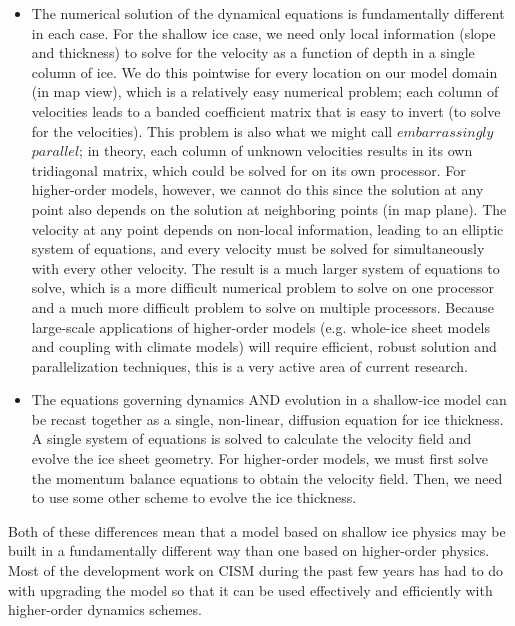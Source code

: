 \begin{itemize}
\item  The numerical solution of the dynamical equations is fundamentally different in each case. For the shallow ice case, we need only local information (slope and thickness) to solve for the velocity as a function of depth in a single column of ice. We do this pointwise for every location on our model domain (in map view), which is a relatively easy numerical problem; each column of velocities leads to a banded coefficient matrix that is easy to invert (to solve for the velocities). This problem is also what we might call $embarrassingly$ $parallel$; in theory, each column of unknown velocities results in its own tridiagonal matrix, which could be solved for on its own processor. For higher-order models, however, we cannot do this since the solution at any point also depends on the solution at neighboring points (in map plane). The velocity at any point depends on non-local information, leading to an elliptic system of equations, and every velocity must be solved for simultaneously with every other velocity. The result is a much larger system of equations to solve, which is a more difficult numerical problem to solve on one processor and a much more difficult problem to solve on multiple processors. Because large-scale applications of higher-order models (e.g. whole-ice sheet models and coupling with climate models) will require efficient, robust solution and parallelization techniques, this is a very active area of current research.  
\end{itemize}

\begin{itemize}
\item  The equations governing dynamics AND evolution in a shallow-ice model can be recast together as a single, non-linear, diffusion equation for ice thickness. A single system of equations is solved to calculate the velocity field and evolve the ice sheet geometry. For higher-order models, we must first solve the momentum balance equations to obtain the velocity field. Then, we need to use some other scheme to evolve the ice thickness. 
\end{itemize}

Both of these differences mean that a model based on shallow ice physics may be built in a fundamentally different way than one based on higher-order physics. Most of the development work on CISM during the past few years has had to do with upgrading the model so that it can be used effectively and efficiently with higher-order dynamics schemes.  

